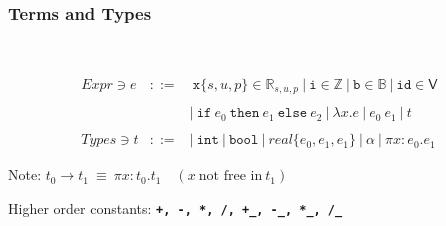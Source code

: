\documentclass[handout,t]{beamer}
\def\mytt#1{\texttt{\textbf{#1}}}
\def\real#1{real\{#1\}}
\def\Pi{\pi}
\begin{document}
\begin{frame}
\frametitle{Terms and Types}

~


$$
\begin{array}{rcl}
Expr\ni e&::=&\ \mathtt{x}\{s,u,p\}\in \mathbb{R}_{s,u,p}\ |\ \mathtt{i}\in \mathbb{Z}\ |\ \mathtt{b}\in \mathbb{B}
\ |\ \mathtt{id}\in\mathsf{V} \\
&&\\
&& |\  \mathtt{if}\ e_0\ \mathtt{then}\ e_1\ \mathtt{else}\ e_2
\ |\ \lambda x.e
\ |\ e_0\ e_1\ |\ t\\
&&\\
Types \ni t&::=&|\ \mathtt{int}\ |\ \mathtt{bool}\ |\ \real{e_0,e_1,e_1}\ |\ \alpha\ |\ \Pi x:e_0.e_1\ 
\end{array}
$$

\color{blue}

\vspace{0.7cm}

Note: $t_0 \rightarrow t_1 \ \equiv\ \Pi x:t_0.t_1 \quad (x\ \text{not free in}\ t_1)$

\vspace{0.5cm}


Higher order constants: \mytt{+, -, *, /, +\_, -\_, *\_, /\_}

\end{frame}
\end{document}

